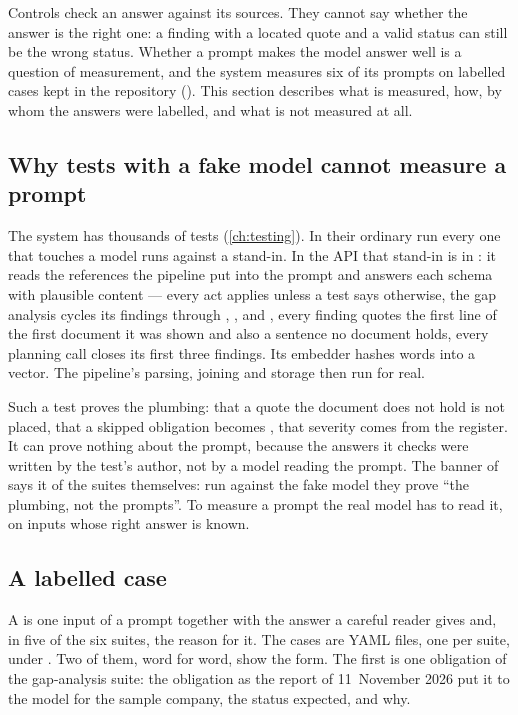 Controls check an answer against its sources. They cannot say whether the answer is the
right one: a finding with a located quote and a valid status can still be the wrong status.
Whether a prompt makes the model answer well is a question of measurement, and the system
measures six of its prompts on labelled cases kept in the repository
(). This section describes what is measured, how, by whom the answers
were labelled, and what is not measured at all.

\subsection{Why tests with a fake model cannot measure a prompt}

The system has thousands of tests (\cref{ch:testing}). In their ordinary run every one that
touches a model runs against a stand-in. In the API that stand-in is  in
: it reads the references the pipeline put into the prompt and answers
each schema with plausible content --- every act applies unless a test says otherwise, the
gap analysis cycles its findings through , ,  and
, every finding quotes the first line of the first document it was shown and
also a sentence no document holds, every planning call closes its first three findings. Its
embedder hashes words into a vector. The pipeline's parsing, joining and storage then run for
real.

Such a test proves the plumbing: that a quote the document does not hold is not placed, that
a skipped obligation becomes , that severity comes from the register. It can
prove nothing about the prompt, because the answers it checks were written by the test's
author, not by a model reading the prompt. The banner of  says it
of the suites themselves: run against the fake model they prove \enquote{the plumbing, not
the prompts}. To measure a prompt the real model has to read it, on inputs whose right answer
is known.

\subsection{A labelled case}\label{sec:control:case}

A  is one input of a prompt together with the answer a careful reader
gives and, in five of the six suites, the reason for it. The cases are YAML files, one per suite, under
. Two of them, word for word, show the form. The first is one
obligation of the gap-analysis suite: the obligation as the report of 11~November 2026 put it
to the model for the sample company, the status expected, and why.

